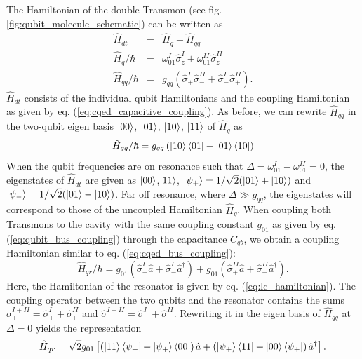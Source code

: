 The Hamiltonian of the double Transmon (see fig. \ref{fig:qubit_molecule_schematic}) can be written as \citep{srinivasan_tunable_2011,gambetta_superconducting_2011}
%
\begin{eqnarray}
\hat{H}_{dt}       & = & \hat{H}_q+\hat{H}_{qq} \\
\hat{H}_{q}/\hbar  & = & \omega_{01}^I\hat{\sigma}_z^I+\omega_{01}^{II}\hat{\sigma}_z^{II} \\
\hat{H}_{qq}/\hbar & = & g_{qq}\left(\hat{\sigma}_+^I\hat{\sigma}_-^{II}+\hat{\sigma}_-^I\hat{\sigma}_+^{II}\right).
\end{eqnarray}
%
$\hat{H}_{dt}$ consists of the individual qubit Hamiltonians and the coupling Hamiltonian as given by eq. (\ref{eq:cqed_capacitive_coupling}). As before, we can rewrite $\hat{H}_{qq}$ in the two-qubit eigen basis $\left| 00 \right>$, $\left| 01 \right>$, $\left| 10 \right>$, $\left| 11 \right>$ of $\hat{H}_q$ as
%
\begin{equation}
\hat{H}_{qq}/\hbar = g_{qq}\left(\left| 10 \right>\left< 01 \right|+\left| 01 \right>\left< 10 \right|\right)
\end{equation}
%
When the qubit frequencies are on resonance such that $\Delta = \omega_{01}^I-\omega_{01}^{II}=0$, the eigenstates of $\hat{H}_{dt}$ are given as $\left| 00 \right>$,$\left| 11 \right>$, $\left| \psi_+ \right>=1/\sqrt{2}(\left| 01 \right>+\left| 10 \right>)$ and $\left| \psi_- \right>=1/\sqrt{2}(\left| 01 \right>-\left| 10 \right>)$. Far off resonance, where $\Delta \gg g_{qq}$, the eigenstates will correspond to those of the uncoupled Hamiltonian $\hat{H}_{q}$. When coupling both Transmons to the cavity with the same coupling constant $g_{01}$ as given by eq. (\ref{eq:qubit_bus_coupling}) through the capacitance $C_{qb}$, we obtain a coupling Hamiltonian similar to eq. (\ref{eq:cqed_bus_coupling}):
%
\begin{equation}
\hat{H}_{qr}/\hbar = g_{01}\left(\hat{\sigma}_+^I\hat{a}+\hat{\sigma}_-^I\hat{a}^\dagger\right)+g_{01}\left(\hat{\sigma}_+^{II}\hat{a}+\hat{\sigma}_-^{II}\hat{a}^\dagger \right). \label{eq:double_transmon_resonator_coupling}
\end{equation}
%
Here, the Hamiltonian of the resonator is given by eq. (\ref{eq:lc_hamiltonian}). The coupling operator between the two qubits and the resonator contains the sums $\hat{\sigma}_+^{I+II}=\hat{\sigma}_+^I+\hat{\sigma}_+^{II}$ and $\hat{\sigma}_-^{I+II}=\hat{\sigma}_-^I+\hat{\sigma}_-^{II}$. Rewriting it in the eigen basis of $\hat{H}_{qq}$ at $\Delta=0$ yields the representation
%
\begin{equation}
\hat{H}_{qr} = \sqrt{2}g_{01}\left[\left(\left| 11 \right>\left< \psi_+ \right|+\left| \psi_+ \right>\left< 00 \right|\right)\hat{a}+\left(\left| \psi_+ \right>\left< 11 \right|+\left| 00 \right>\left< \psi_+ \right|\right)\hat{a}^\dagger\right].
\end{equation}
